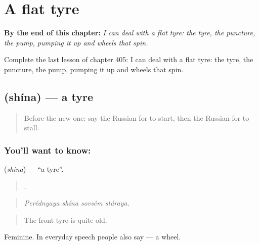 
\chapter{A flat tyre}
\label{ch:ru-a-flat-tyre}

\begin{chapteropening}
\textbf{By the end of this chapter:} \emph{I can deal with a flat tyre: the tyre, the puncture, the pump, pumping it up and wheels that spin.}

Complete the last lesson of chapter 405: I can deal with a flat tyre: the tyre, the puncture, the pump, pumping it up and wheels that spin.
\end{chapteropening}

\section[\texorpdfstring{\ru{шина} (shína)}{шина (shína)}]{ (shína) — a tyre}

\label{lesson:RU-C405-shina}



\begin{quote}
Before the new one: say the Russian for to start, then the Russian for to stall.
\end{quote}

\subsection*{You'll want to know: }
\textbf{} (\emph{shína}) — \textquotedblleft{}a tyre\textquotedblright{}.

\begin{quote}
   .
\end{quote}

\begin{quote}
\emph{Perédnyaya shína sovsém stáraya.}
\end{quote}

\begin{quote}
The front tyre is quite old.
\end{quote}

Feminine. In everyday speech people also say \emph{} — a wheel.

